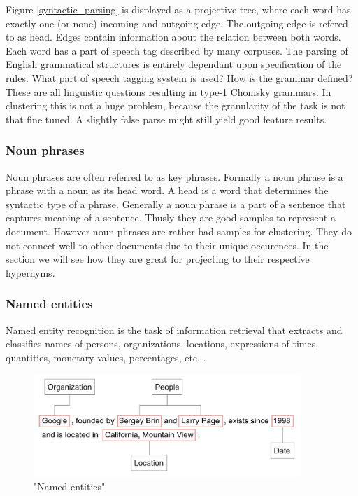   Figure \ref{syntactic_parsing} is displayed as a projective tree, where each word has exactly one (or none) incoming and outgoing edge. The outgoing edge is refered to as head. Edges contain information about the relation between both words. Each word has a part of speech tag described by many corpuses. \cite[Wordnet, Penn-treebank, Google-ngrams]{Nothing}
  The parsing of English grammatical structures is entirely dependant upon specification of the rules. What part of speech tagging system is used? How is the grammar defined? These are all linguistic questions resulting in type-1 Chomsky grammars. \cite[Chomsky]{Nothing}
  In clustering this is not a huge problem, because the granularity of the task is not that fine tuned. A slightly false parse might still yield good feature results.

  \subsubsection{Noun phrases}
  Noun phrases are often referred to as key phrases. Formally a noun phrase is a phrase with a noun as its head word. A head is a word that determines the syntactic type of a phrase. Generally a noun phrase is a part of a sentence that captures meaning of a sentence. Thusly they are good samples to represent a document. However noun phrases are rather bad samples for clustering. They do not connect well to other documents due to their unique occurences. In the \wordnet{} section we will see how they are great for projecting to their respective hypernyms.

  \subsubsection{Named entities}
  Named entity recognition is the task of information retrieval that extracts and classifies  names of persons, organizations, locations, expressions of times, quantities, monetary values, percentages, etc. \cite[Wikipedia]{Nothing}. 

    \begin{figure}[h!]
      \centering
        \includegraphics[width=0.9\textwidth]{ner_tags.png}
        \caption{"Named entities"}
        \label{ner_tags}
    \end{figure} 


